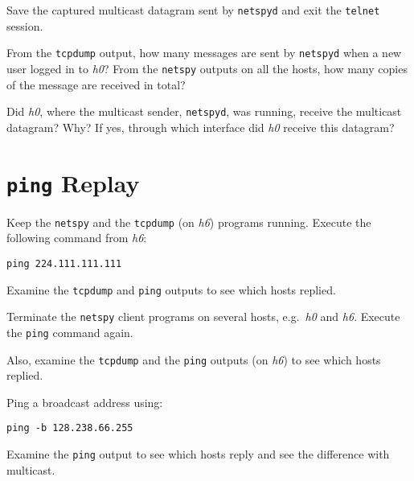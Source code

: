 \documentclass{../UTNetLab}
\begin{document}
    Save the captured multicast datagram sent by \lstinline{netspyd} and exit the \lstinline{telnet} session.

    \begin{report}
        \item From the \lstinline{tcpdump} output, how many messages are sent by \lstinline{netspyd} when a new user logged in to \textit{h0}?
            From the \lstinline{netspy} outputs on all the hosts, how many copies of the message are received in total?

        \item Did \textit{h0}, where the multicast sender, \lstinline{netspyd}, was running, receive the multicast datagram?
            Why?
            If yes, through which interface did \textit{h0} receive this datagram?
    \end{report}

\section{\texttt{ping} Replay}
    Keep the \lstinline{netspy} and the \lstinline{tcpdump} (on \textit{h6}) programs running.
    Execute the following command from \textit{h6}:

    \begin{lstlisting}
ping 224.111.111.111
    \end{lstlisting}
    Examine the \lstinline{tcpdump} and \lstinline{ping} outputs to see which hosts replied.

    Terminate the \lstinline{netspy} client programs on several hosts, e.g.\ \textit{h0} and \textit{h6}.
    Execute the \lstinline{ping} command again.

    Also, examine the \lstinline{tcpdump} and the \lstinline{ping} outputs (on \textit{h6}) to see which hosts replied.

    Ping a broadcast address using:

    \begin{lstlisting}
ping -b 128.238.66.255
    \end{lstlisting}
    Examine the \lstinline{ping} output to see which hosts reply and see the difference with multicast.
\end{document}
